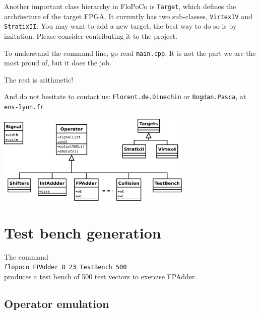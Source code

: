 \documentclass{article}
\begin{document}
Another important class hierarchy in FloPoCo is \texttt{Target}, which
defines the architecture of the target FPGA. It currently has two
sub-classes, \texttt{VirtexIV} and \texttt{StratixII}. You may want to
add a new target, the best way to do so is by imitation. Please
consider contributing it to the project.

To understand the command line, go read \texttt{main.cpp}. It is not
the part we are the most proud of, but it does the job.

The rest is arithmetic!

And do not hesitate to contact us: \texttt{Florent.de.Dinechin} or
\texttt{Bogdan.Pasca}, at \texttt{ens-lyon.fr}

\begin{center}
  \begin{latexonly}
  \includegraphics[width=0.7\textwidth]{../Figures/FloPoCoClasses.pdf}        
  \end{latexonly}
\end{center}

\section{Test bench generation}

The command\\
 \texttt{flopoco FPAdder 8 23 TestBench 500} \\
produces a test bench of 500 test vectors to exercise FPAdder.

\subsection{Operator emulation}
\end{document}
